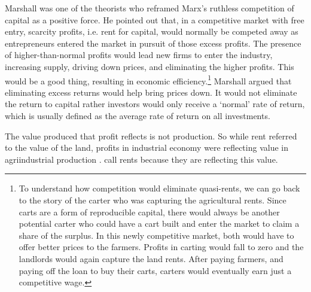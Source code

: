 Marshall was one of the theorists who reframed Marx's ruthless competition of capital as a positive force.  
He pointed out that, in a competitive market with \gls{free entry}, {scarcity profits}, i.e. rent for capital, would normally be competed away as entrepreneurs entered the market in pursuit of those \gls{excess profits}. The presence of higher-than-normal profits would lead new firms to enter the industry, increasing supply, driving down prices, and eliminating the higher profits.  This would be a good thing, resulting in economic efficiency.\footnote{To understand how competition would eliminate quasi-rents, we can go back to the story of the carter who was capturing the agricultural rents. Since carts are a form of reproducible capital, there would always be another potential carter who could have a cart built and enter the market to claim a share of the surplus. In this newly competitive market, both would have to offer better prices to the farmers. Profits in carting would fall to zero and the landlords would again capture the land rents. After paying farmers, and paying off the loan to buy their carts, carters would eventually earn just a competitive wage.} Marshall argued that eliminating  excess returns would help bring prices down. It would not eliminate the return to capital rather investors would only receive a `normal'  rate of return, which is usually defined as the average rate of return on all investments.



The value produced that profit reflects is not production. So while rent referred to the value of the land, profits in industrial economy were reflecting value in agriindustrial production . call rents because they are reflecting this value. 


